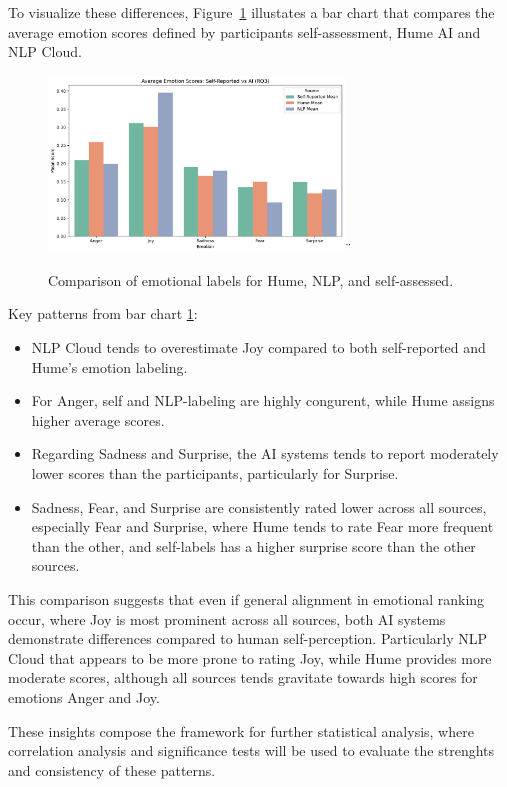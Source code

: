 To visualize these differences, Figure~\ref{fig:comp-bar-rq3-all} illustates a bar chart that compares the average emotion scores defined by 
participants self-assessment, Hume AI and NLP Cloud. 

\begin{figure}[!h]
    \centering
    \includegraphics[width=0.7\textwidth]{png/results/rq3/rq3_emotion_comparison.pdf}¨
    \caption{Comparison of emotional labels for Hume, NLP, and self-assessed.}
    \label{fig:comp-bar-rq3-all}
\end{figure}

Key patterns from bar chart \ref{fig:comp-bar-rq3-all}:
\begin{itemize}
    \item NLP Cloud tends to overestimate Joy compared to both self-reported and Hume's emotion labeling. 
    \item For Anger, self and NLP-labeling are highly congurent, while Hume assigns higher average scores.
    \item Regarding Sadness and Surprise, the AI systems tends to report moderately lower scores than the participants, particularly for Surprise. 
    \item Sadness, Fear, and Surprise are consistently rated lower across all sources, especially Fear and Surprise, where Hume tends to rate Fear more frequent than the other, and self-labels has a higher surprise score than the other sources.
\end{itemize}
This comparison suggests that even if general alignment in emotional ranking occur, where Joy is most prominent across all sources, both AI systems 
demonstrate differences compared to human self-perception. Particularly NLP Cloud that appears to be more prone to rating Joy, while Hume provides more moderate scores, although all sources tends gravitate towards high scores for emotions Anger and Joy. 

These insights compose the framework for further statistical analysis, where correlation analysis and significance tests will 
be used to evaluate the strenghts and consistency of these patterns. 


